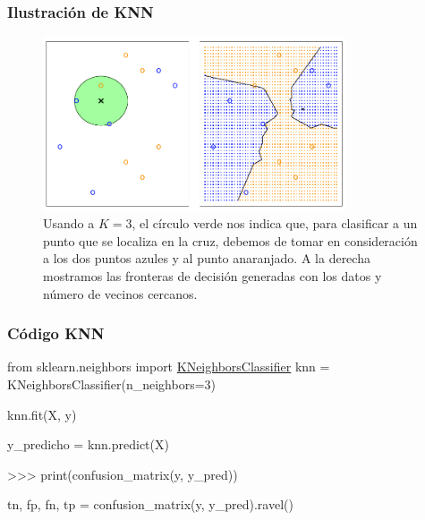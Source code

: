 \documentclass[usenames,dvipsnames]{beamer} %
\begin{document}
\begin{frame}\frametitle{Ilustraci\'on de KNN}
\begin{figure}
	\centering
	\includegraphics[width=0.8\textwidth]{images/islr/fig_2_14.png}
	\caption{Usando a $K=3$, el c\'irculo verde nos indica que, para clasificar a un punto que se localiza en la cruz, debemos de tomar en consideraci\'on a los dos puntos azules y al punto anaranjado. A la derecha mostramos las fronteras de decisi\'on generadas con los datos y n\'umero de vecinos cercanos.}
	\label{fig:islr_2-14}
\end{figure}
\end{frame}

\begin{frame}[fragile]\frametitle{C\'odigo KNN}
\begin{semiverbatim}
	\textcolor{deepblue}{from} sklearn.neighbors \textcolor{deepblue}{import} \href{https://scikit-learn.org/stable/modules/generated/sklearn.neighbors.KNeighborsClassifier.html}{KNeighborsClassifier}
	knn = KNeighborsClassifier(n\_neighbors=3)
	
	knn.fit(X, y)
	
	y\_predicho = knn.predict(X)
	
	>>> print(confusion\_matrix(y, y\_pred))
	
	tn, fp, fn, tp = confusion\_matrix(y, y\_pred).ravel()
	
\end{semiverbatim}
\end{frame}
\end{document}
